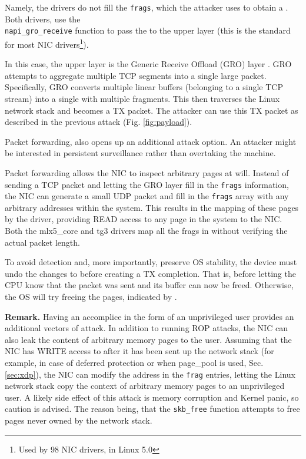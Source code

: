 Namely, the drivers do not fill the \texttt{frags}, which the attacker uses to obtain a \kva. Both drivers, use the \\\texttt{napi\_gro\_receive} function to pass the \skb{} to the upper layer (this is the standard for most NIC drivers\footnote{Used by 98 NIC drivers, in Linux 5.0}). 

In this case, the upper layer is the Generic Receive Offload (GRO) layer \cite{gro}. GRO attempts to aggregate multiple TCP segments into a single large packet. Specifically, GRO converts multiple linear \skb{} buffers (belonging to a single TCP stream) into a single \skb{} with multiple fragments. This \skb{} then traverses the Linux network stack and becomes a TX packet. The attacker can use this TX packet as described in the previous attack (Fig. \ref{fig:payload}).

Packet forwarding, also opens up an additional attack option. An attacker might be interested in persistent surveillance rather than overtaking the machine. 

Packet forwarding allows the NIC to inspect arbitrary pages at will. 
Instead of sending a TCP packet and letting the GRO layer fill in the \texttt{frags} information, the NIC can generate a small UDP packet and fill in the \texttt{frags} array with any arbitrary \page{} addresses within the system. This results in the mapping of these pages by the driver, providing READ access to any page in the system to the NIC. Both the mlx5\_core and tg3 drivers map all the frags in \shinfo{} without verifying the actual packet length.

To avoid detection and, more importantly, preserve OS stability, the device must undo the changes to \shinfo{} before creating a TX completion. That is, before letting the CPU know that the packet was sent and its buffer can now be freed. Otherwise, the OS will try freeing the pages, indicated by \shinfo.

\smallskip
\noindent\textbf{Remark.} Having an accomplice in the form of an unprivileged user provides an additional vectors of attack. In addition to running ROP attacks, the NIC can also leak the content of arbitrary memory pages to the user. Assuming that the NIC has WRITE access to \shinfo{} after it has been sent up the network stack (for example, in case of deferred protection or when page\_pool is used, Sec. \ref{sec:xdp}), the NIC can modify the \page{} address in the \texttt{frag} entries, letting the Linux network stack copy the context of arbitrary memory pages to an unprivileged user. A likely side effect of this attack is memory corruption and Kernel panic, so caution is advised. The reason being, that the \texttt{skb\_free} function attempts to free pages never owned by the network stack.
